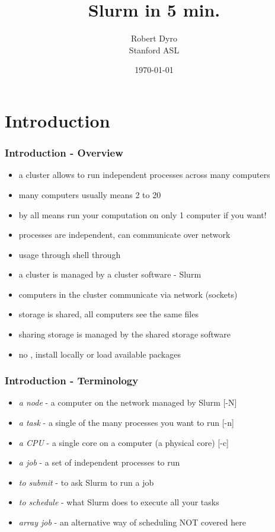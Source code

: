 \documentclass[10pt,mathserif, notes]{beamer}
\title{\LARGE \bfseries Slurm in 5 min.}
\author{\large Robert Dyro\\Stanford ASL}
\date{\today}
\newcommand{\code}[1]{\tcbox[nobeforeafter, box align=base,size=fbox]{%
\texttt{#1}}%
}
\begin{document}
\frame{
  \thispagestyle{empty}
  \titlepage
}

\section{Introduction}

\begin{frame}[fragile]
\frametitle{Introduction - Overview}
\begin{itemize}
\item a cluster allows to run independent processes across many computers
\item many computers usually means 2 to 20
\item by all means run your computation on only 1 computer if you want!
\item processes are independent, can communicate over network
\item usage through shell through \code{ssh}
\item a cluster is managed by a cluster software - Slurm
\item computers in the cluster communicate via network (sockets)
\item storage is shared, all computers see the same files
\item sharing storage is managed by the shared storage software 
\item no \code{sudo}, install locally or load available packages
\end{itemize}

\end{frame}

\begin{frame}[fragile]
\frametitle{Introduction - Terminology}
\begin{itemize}
\item \emph{a node} - a computer on the network managed by Slurm [-N]
\item \emph{a task} - a single of the many processes you want to run [-n]
\item \emph{a CPU} - a single core on a computer (a physical core) [-c]
\item \emph{a job} - a set of independent processes to run
\item \emph{to submit} - to ask Slurm to run a job
\item \emph{to schedule} - what Slurm does to execute all your tasks
\item \emph{array job} - an alternative way of scheduling NOT covered here
\end{itemize}
\end{frame}
\end{document}
